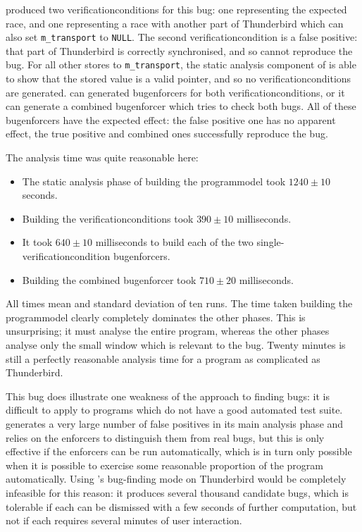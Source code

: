 {\Implementation} produced two \glspl{verificationcondition} for this
bug: one representing the expected race, and one representing a race
with another part of Thunderbird which can also set
\texttt{m\_transport} to \texttt{NULL}.  The second
\gls{verificationcondition} is a false positive: that part of
Thunderbird is correctly synchronised, and so cannot reproduce the
bug.  For all other stores to \texttt{m\_transport}, the static
analysis component of {\implementation} is able to show that the
stored value is a valid pointer, and so no
\glspl{verificationcondition} are generated.  {\Implementation} can
generated \glspl{bugenforcer} for both \glspl{verificationcondition},
or it can generate a combined \gls{bugenforcer} which tries to check
both bugs.  All of these \glspl{bugenforcer} have the expected effect:
the false positive one has no apparent effect, the true positive and
combined ones successfully reproduce the bug.

The analysis time was quite reasonable here:

\begin{itemize}
\item The static analysis phase of building the \gls{programmodel}
  took $1240 \pm 10$ seconds.
\item Building the \glspl{verificationcondition} took $390 \pm 10$
  milliseconds.
\item It took $640 \pm 10$ milliseconds to build each of the two
  single-\gls{verificationcondition} \glspl{bugenforcer}.
\item Building the combined \gls{bugenforcer} took $710 \pm 20$
  milliseconds.
\end{itemize}

All times mean and standard deviation of ten runs.  The time taken
building the \gls{programmodel} clearly completely dominates the other
phases.  This is unsurprising; it must analyse the entire program,
whereas the other phases analyse only the small window which is
relevant to the bug.  Twenty minutes is still a perfectly reasonable
analysis time for a program as complicated as Thunderbird.

This bug does illustrate one weakness of the {\technique} approach to
finding bugs: it is difficult to apply to programs which do not have a
good automated test suite.  {\Technique} generates a very large number
of false positives in its main analysis phase and relies on the
enforcers to distinguish them from real bugs, but this is only
effective if the enforcers can be run automatically, which is in turn
only possible when it is possible to exercise some reasonable
proportion of the program automatically.  Using {\technique}'s
bug-finding mode on Thunderbird would be completely infeasible for
this reason: it produces several thousand candidate bugs, which is
tolerable if each can be dismissed with a few seconds of further
computation, but not if each requires several minutes of user
interaction.

